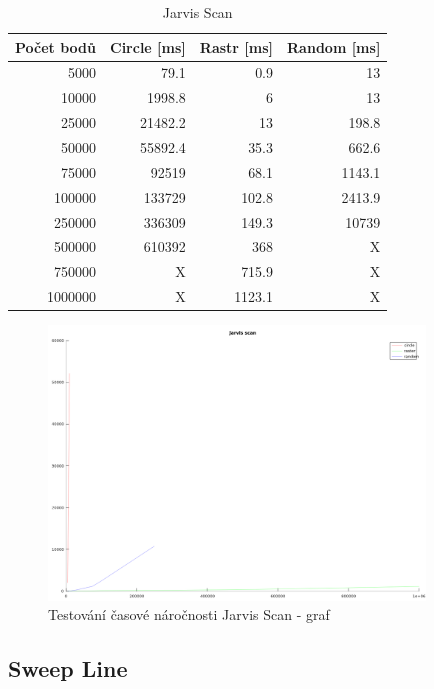 \documentclass[a4paper, 12pt]{article}
\begin{document}
\begin{table}[h!]
	\centering
	\begin{tabular}{|r|r|r|r|}
	\hline
	 \textbf{Počet bodů} 	& \textbf{Circle [ms]} & \textbf{Rastr [ms]}  & \textbf{Random [ms]} \\ \hline
	 5000 & 79.1 & 0.9 & 13   \\ \hline
	10000 & 1998.8 & 6 & 13   \\ \hline
	25000 & 21482.2 & 13 & 198.8  \\ \hline
	50000 & 55892.4 & 35.3 & 662.6   \\ \hline
	75000 & 92519 & 68.1 & 1143.1 \\ \hline
	100000 & 133729 & 102.8 & 2413.9  \\ \hline
	250000 & 336309 & 149.3 & 10739   \\ \hline
	500000 & 610392 & 368 & X  \\ \hline
	750000 & X & 715.9 & X  \\ \hline
	1000000 & X & 1123.1 & X  \\ \hline
	
	\end{tabular}
		\caption{Jarvis Scan}
\end{table}

\begin{figure}[h!]
	\centering
	\includegraphics[width=10cm]{figure_jarvis_scan.png}
	\caption{Testování časové náročnosti Jarvis Scan - graf}
\end{figure}

\subsection{Sweep Line}
\end{document}
